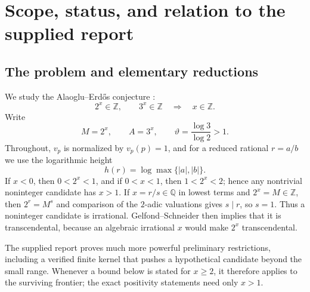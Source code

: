 \documentclass[11pt]{article}
\numberwithin{equation}{section}
\theoremstyle{definition}
\theoremstyle{remark}
\newcommand{\Q}{\mathbb Q}
\newcommand{\Z}{\mathbb Z}
\begin{document}
\begin{abstract}
Finally, the symmetric prime-valuation tensor underlying
$\log M\log3-\log A\log2=0$ is analyzed.  Alternating Steinberg symbols annihilate it by parity, while diagonal one-place symmetric pairings are blind to all external-prime edges.  Thus any reciprocity proof must be genuinely bi-local (coupling two distinct primes) or must mix places before localization.  This sharpens the earlier ``wrong-sign $K_2$'' diagnosis into a precise linear-algebraic no-go theorem and a concrete research specification.
\end{abstract}

\tableofcontents

\section{Scope, status, and relation to the supplied report}

\subsection{The problem and elementary reductions}

We study the Alaoglu--Erd\H{o}s conjecture \cite{AlaogluErdos}:
\begin{equation}\label{eq:AE}
  2^x\in\Z,\qquad 3^x\in\Z
  \quad\Longrightarrow\quad x\in\Z.
\end{equation}
Write
\begin{equation}\label{eq:MA-theta}
  M=2^x,\qquad A=3^x,\qquad
  \vartheta=\frac{\log3}{\log2}>1.
\end{equation}
Throughout, $v_p$ is normalized by $v_p(p)=1$, and for a reduced rational $r=a/b$ we use the logarithmic height
\[
  h(r)=\log\max\{|a|,|b|\}.
\]
If $x<0$, then $0<2^x<1$, and if $0<x<1$, then $1<2^x<2$; hence any nontrivial noninteger candidate has $x>1$.  If $x=r/s\in\Q$ in lowest terms and $2^x=M\in\Z$, then $2^r=M^s$ and comparison of the $2$-adic valuations gives $s\mid r$, so $s=1$.  Thus a noninteger candidate is irrational.  Gelfond--Schneider then implies that it is transcendental, because an algebraic irrational $x$ would make $2^x$ transcendental.

The supplied report \cite{Unified6} proves much more powerful preliminary restrictions, including a verified finite kernel that pushes a hypothetical candidate beyond the small range.  Whenever a bound below is stated for $x\ge2$, it therefore applies to the surviving frontier; the exact positivity statements need only $x>1$.
\end{document}
